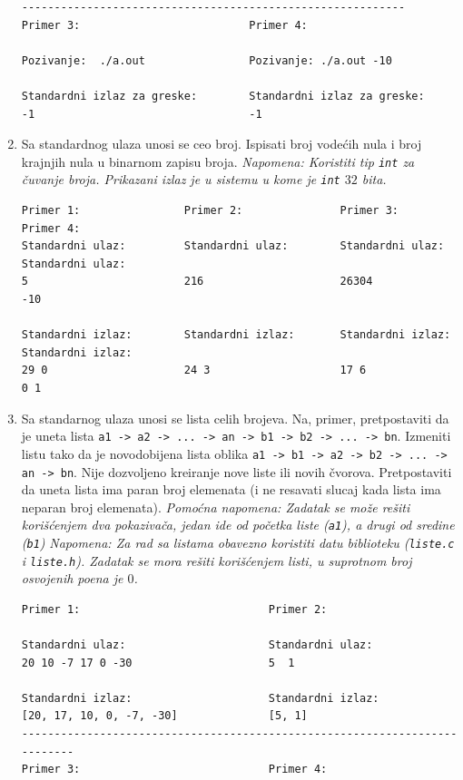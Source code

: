 \begin{enumerate}
\begin{verbatim}
-----------------------------------------------------------
Primer 3:                          Primer 4:

Pozivanje:  ./a.out                Pozivanje: ./a.out -10

Standardni izlaz za greske:        Standardni izlaz za greske:
-1                                 -1
\end{verbatim}

\item Sa standardnog ulaza unosi se ceo broj. Ispisati broj vodećih nula i broj krajnjih nula u binarnom zapisu broja. {\em Napomena: Koristiti tip {\tt int} za čuvanje broja. Prikazani izlaz je u sistemu u kome je {\tt int} $32$ bita.}
\begin{verbatim}
Primer 1:                Primer 2:               Primer 3:                  Primer 4:
Standardni ulaz:         Standardni ulaz:        Standardni ulaz:           Standardni ulaz:
5                        216                     26304                      -10

Standardni izlaz:        Standardni izlaz:       Standardni izlaz:          Standardni izlaz:
29 0                     24 3                    17 6                       0 1
\end{verbatim}

\item Sa standarnog ulaza unosi se lista celih brojeva. Na, primer, pretpostaviti da je uneta lista {\tt a1 -> a2 -> ... -> an -> b1 -> b2 -> ... -> bn}. Izmeniti listu tako da je novodobijena lista oblika {\tt a1 -> b1 -> a2 -> b2 -> ... -> an -> bn}. Nije dozvoljeno kreiranje nove liste ili novih čvorova. Pretpostaviti da uneta lista ima paran broj elemenata (i ne resavati slucaj kada lista ima neparan broj elemenata). {\em Pomoćna napomena: Zadatak se može rešiti korišćenjem dva pokazivača, jedan ide od početka liste ({\tt a1}), a drugi od sredine ({\tt b1})} {\em Napomena: Za rad sa listama obavezno koristiti datu biblioteku ({\tt liste.c} i {\tt liste.h}). Zadatak se mora rešiti korišćenjem listi, u suprotnom broj osvojenih poena je $0$.}
\begin{verbatim}
Primer 1:                             Primer 2:             

Standardni ulaz:                      Standardni ulaz:      
20 10 -7 17 0 -30                     5  1                   

Standardni izlaz:                     Standardni izlaz:     
[20, 17, 10, 0, -7, -30]              [5, 1]          
---------------------------------------------------------------------------
Primer 3:                             Primer 4:   


\end{verbatim}
\end{enumerate}
